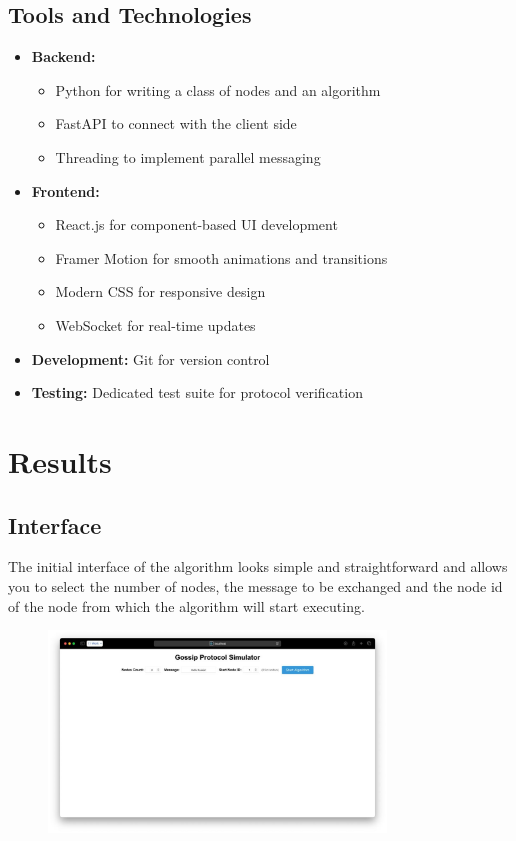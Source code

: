 \documentclass[a4paper,12pt]{article}
\begin{document}
\subsection{Tools and Technologies}
\begin{itemize}
    \item \textbf{Backend:}
        \begin{itemize}
            \item Python for writing a class of nodes and an algorithm
            \item FastAPI to connect with the client side
            \item Threading to implement parallel messaging
        \end{itemize}
    \item \textbf{Frontend:} 
        \begin{itemize}
            \item React.js for component-based UI development
            \item Framer Motion for smooth animations and transitions
            \item Modern CSS for responsive design
            \item WebSocket for real-time updates
        \end{itemize}
    \item \textbf{Development:} Git for version control
    \item \textbf{Testing:} Dedicated test suite for protocol verification
\end{itemize}

\section{Results}

\subsection{Interface}
The initial interface of the algorithm looks simple and straightforward and allows you to select the number of nodes, the message to be exchanged and the node id of the node from which the algorithm will start executing.
\begin{figure}[H]
    \centering
    \includegraphics[width=0.8\textwidth]{figures/interface.jpeg}
    \label{fig:screenshot1}
\end{figure}
\end{document}
